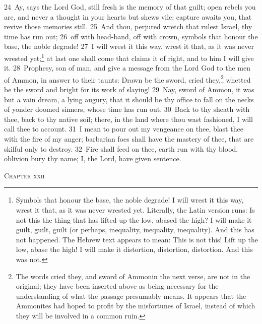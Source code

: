 \documentclass[10pt]{book} %
\begin{document}
\textcolor{benred8}{24}~Ay, says the Lord God, still fresh is the memory of that guilt; open rebels you are, and never a thought in your hearts but shews vile; capture awaits you, that revive those memories still. \textcolor{benred8}{25}~And thou, perjured wretch that rulest Israel, thy time has run out; \textcolor{benred8}{26}~off with head-band, off with crown, symbols that honour the base, the noble degrade! \textcolor{benred8}{27}~I will wrest it this way, wrest it that, as it was never wrested yet;\footnote[4]{\textasciigrave Symbols that honour the base, the noble degrade! I will wrest it this way, wrest it that, as it was never wrested yet\textquotesingle . Literally, the Latin version runs: \textasciigrave Is not this the thing that has lifted up the low, abased the high? I will make it guilt, guilt, guilt (or perhaps, inequality, inequality, inequality). And this has not happened\textquotesingle . The Hebrew text appears to mean: \textasciigrave This is not this! Lift up the low, abase the high! I will make it distortion, distortion, distortion. And this was not\textquotesingle .} at last one shall come that claims it of right, and to him I will give it.
\textcolor{benred8}{28}~Prophesy, son of man, and give a message from the Lord God to the men of Ammon, in answer to their taunts: Drawn be the sword, cried they,\footnote[5]{The words \textasciigrave cried they\textquotesingle , and \textasciigrave sword of Ammon\textquotesingle  in the next verse, are not in the original; they have been inserted above as being necessary for the understanding of what the passage presumably means. It appears that the Ammonites had hoped to profit by the misfortunes of Israel, instead of which they will be involved in a common ruin.} whetted be the sword and bright for its work of slaying! \textcolor{benred8}{29}~Nay, sword of Ammon, it was but a vain dream, a lying augury, that it should be thy office to fall on the necks of yonder doomed sinners, whose time has run out. \textcolor{benred8}{30}~Back to thy sheath with thee, back to thy native soil; there, in the land where thou wast fashioned, I will call thee to account. \textcolor{benred8}{31}~I mean to pour out my vengeance on thee, blast thee with the fire of my anger; barbarian foes shall have the mastery of thee, that are skilful only to destroy. \textcolor{benred8}{32}~Fire shall feed on thee, earth run with thy blood, oblivion bury thy name; I, the Lord, have given sentence.
\begin{large}\begin{center}\textsc{Chapter xxii}\end{center}\end{large}
\end{document}
